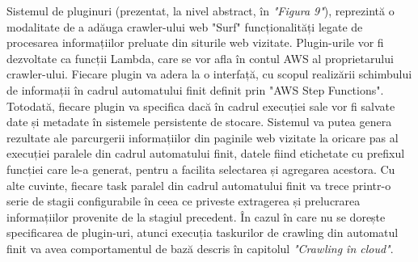 Sistemul de pluginuri (prezentat, la nivel abstract, în \textit{"Figura 9"}), reprezintă o modalitate de a adăuga crawler-ului web "Surf" funcționalități legate de procesarea informațiilor preluate din siturile web vizitate. Plugin-urile vor fi dezvoltate ca funcții Lambda, care se vor afla în contul AWS al proprietarului crawler-ului. Fiecare plugin va adera la o interfață, cu scopul realizării schimbului de informații în cadrul automatului finit definit prin "AWS Step Functions". Totodată, fiecare plugin va specifica dacă în cadrul execuției sale vor fi salvate date și metadate în sistemele persistente de stocare. Sistemul va putea genera rezultate ale parcurgerii informațiilor din paginile web vizitate la oricare pas al execuției paralele din cadrul automatului finit, datele fiind etichetate cu prefixul funcției  care le-a generat, pentru a facilita selectarea și agregarea acestora. Cu alte cuvinte, fiecare task paralel din cadrul automatului finit va trece printr-o serie de stagii configurabile în ceea ce priveste extragerea și prelucrarea informațiilor provenite de la stagiul precedent. În cazul în care nu se dorește specificarea de plugin-uri, atunci execuția taskurilor de crawling din automatul finit va avea comportamentul de bază descris în capitolul \textit{"Crawling în cloud"}.